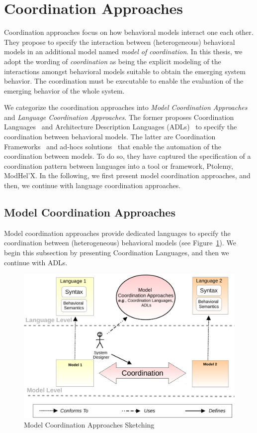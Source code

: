 \section{Coordination Approaches}
Coordination approaches focus on how behavioral models interact one each other. They propose to specify the interaction between (heterogeneous) behavioral models in an additional model named \emph{model of coordination}. In this thesis, we adopt the wording of \emph{coordination} as being the explicit modeling of the interactions amongst behavioral models suitable to obtain the emerging system behavior. The coordination must be executable to enable the evaluation of the emerging behavior of the whole system. 

We categorize the coordination approaches into \emph{Model Coordination Approaches} and \emph{Language Coordination Approaches}. The former proposes Coordination Languages~\cite{coordsignibib} and Architecture Description Languages (ADLs)~\cite{frameadlsbib} to specify the coordination between behavioral models. The latter are Coordination Frameworks~\cite{ptoleframebib,modhelxbib} and ad-hocs solutions~\cite{mascotbib,dinatale} that enable the automation of the coordination between models. To do so, they have captured the specification of a coordination pattern between languages into a tool or framework, \eg Ptolemy, ModHel'X. In the following, we first present model coordination approaches, and then, we continue with language coordination approaches.
\subsection{Model Coordination Approaches}
Model coordination approaches provide dedicated languages to specify the coordination between (heterogeneous) behavioral models (see Figure~\ref{fig:modelcoord}). We begin this subsection by presenting Coordination Languages, and then we continue with ADLs. 

\begin{figure}
	\begin{center}
		\includegraphics[width=.7\textwidth]{background/figs/coordmodel}
		\caption{Model Coordination Approaches Sketching}
		\label{fig:modelcoord}
	\end{center}
\end{figure}

